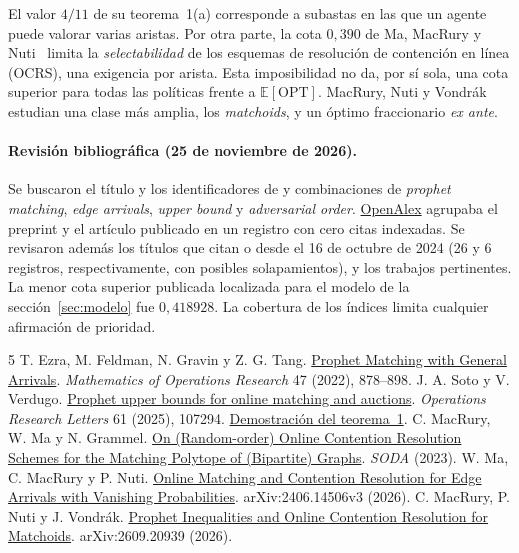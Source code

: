 \documentclass[11pt,a4paper]{article}
\newcommand{\E}{\mathbb{E}}
\newcommand{\OPT}{\mathrm{OPT}}
\begin{document}
El valor \(4/11\) de su teorema~1(a) corresponde a subastas en las que un agente puede valorar varias aristas. Por otra parte, la cota \(0{,}390\) de Ma, MacRury y Nuti~\cite{mmn} limita la \emph{selectabilidad} de los esquemas de resolución de contención en línea (OCRS), una exigencia por arista. Esta imposibilidad no da, por sí sola, una cota superior para todas las políticas frente a \(\E[\OPT]\). MacRury, Nuti y Vondrák~\cite{mnv} estudian una clase más amplia, los \emph{matchoids}, y un óptimo fraccionario \emph{ex ante}.

\paragraph{Revisión bibliográfica (25 de noviembre de 2026).}
Se buscaron el título y los identificadores de \cite{sv} y combinaciones de \emph{prophet matching}, \emph{edge arrivals}, \emph{upper bound} y \emph{adversarial order}. \href{https://openalex.org/W4409264837}{OpenAlex} agrupaba el preprint y el artículo publicado en un registro con cero citas indexadas. Se revisaron además los títulos que citan \cite{ezra} o \cite{mmg} desde el 16 de octubre de 2024 (26 y 6 registros, respectivamente, con posibles solapamientos), y los trabajos pertinentes. La menor cota superior publicada localizada para el modelo de la sección~\ref{sec:modelo} fue \(0{,}418928\). La cobertura de los índices limita cualquier afirmación de prioridad.

\begingroup\small
{}
\begin{thebibliography}{5}\setlength{\itemsep}{2pt}
 T. Ezra, M. Feldman, N. Gravin y Z. G. Tang.
\href{https://doi.org/10.1287/moor.2021.1152}{Prophet Matching with General Arrivals}.
\emph{Mathematics of Operations Research} 47 (2022), 878--898.
 J. A. Soto y V. Verdugo.
\href{https://doi.org/10.1016/j.orl.2025.107294}{Prophet upper bounds for online matching and auctions}.
\emph{Operations Research Letters} 61 (2025), 107294. \href{https://arxiv.org/html/2410.12756v1#S3}{Demostración del teorema~1}.
 C. MacRury, W. Ma y N. Grammel.
\href{https://doi.org/10.1137/1.9781611977554.ch76}{On (Random-order) Online Contention Resolution Schemes for the Matching Polytope of (Bipartite) Graphs}.
\emph{SODA} (2023).
 W. Ma, C. MacRury y P. Nuti.
\href{https://arxiv.org/abs/2406.14506v3}{Online Matching and Contention Resolution for Edge Arrivals with Vanishing Probabilities}.
arXiv:2406.14506v3 (2026).
 C. MacRury, P. Nuti y J. Vondrák.
\href{https://arxiv.org/abs/2609.20939}{Prophet Inequalities and Online Contention Resolution for Matchoids}.
arXiv:2609.20939 (2026).
\end{thebibliography}
\endgroup
\end{document}
